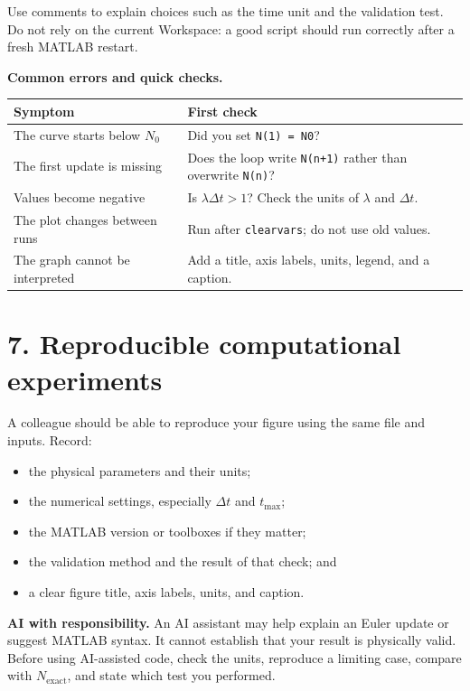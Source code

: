 \documentclass[11pt,a4paper]{article}
\begin{document}
Use comments to explain choices such as the time unit and the validation test. Do not rely on the current Workspace: a good script should run correctly after a fresh MATLAB restart.

\textbf{Common errors and quick checks.}
\begin{center}
\small
\begin{tabular}{>{\raggedright\arraybackslash}p{.38\linewidth}>{\raggedright\arraybackslash}p{.48\linewidth}}
\toprule
\textbf{Symptom} & \textbf{First check}\\ \midrule
The curve starts below $N_0$ & Did you set \texttt{N(1) = N0}?\\
The first update is missing & Does the loop write \texttt{N(n+1)} rather than overwrite \texttt{N(n)}?\\
Values become negative & Is $\lambda\Delta t>1$? Check the units of $\lambda$ and $\Delta t$.\\
The plot changes between runs & Run after \texttt{clearvars}; do not use old values.\\
The graph cannot be interpreted & Add a title, axis labels, units, legend, and a caption.\\ \bottomrule
\end{tabular}
\end{center}

\newpage
\section*{7. Reproducible computational experiments}
A colleague should be able to reproduce your figure using the same file and inputs. Record:
\begin{itemize}[nosep,leftmargin=5mm]
  \item the physical parameters and their units;
  \item the numerical settings, especially $\Delta t$ and $t_{\max}$;
  \item the MATLAB version or toolboxes if they matter;
  \item the validation method and the result of that check; and
  \item a clear figure title, axis labels, units, and caption.
\end{itemize}

\begin{aibox}
\textbf{AI with responsibility.} An AI assistant may help explain an Euler update or suggest MATLAB syntax. It cannot establish that your result is physically valid. Before using AI-assisted code, check the units, reproduce a limiting case, compare with $N_{\mathrm{exact}}$, and state which test you performed.
\end{aibox}
\end{document}
